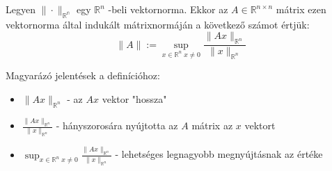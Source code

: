 \begin{definition}
    Legyen $\| \cdot \| _\mathbb{R^{n}}$ egy $\mathbb{R}^{n}$ -beli vektornorma. Ekkor az $A \in \mathbb{R}^{n \times n}$ mátrix ezen vektornorma által indukált mátrixnormáján a következő számot értjük: 
    \begin{equation*}
\| A \| := \sup_{x \in \mathbb{R}^{n} \; x \neq 0} \frac{\| Ax \| _{\mathbb{R}^{n}}}{\| x \| _{\mathbb{R}^{n}}}
    \end{equation*}
\end{definition}
Magyarázó jelentések a definícióhoz:
\begin{itemize}
    \item $\| Ax \|_{\mathbb{R}^{n}}$ - az $Ax$ vektor "hossza"
    \item $\frac{\| Ax \| _{\mathbb{R}^{n}}}{\| x \| _{\mathbb{R}^{n}}}$ - hányszorosára nyújtotta az $A$ mátrix az $x$ vektort
    \item $\sup_{x \in \mathbb{R}^{n} \; x \neq 0} \frac{\| Ax \| _{\mathbb{R}^{n}}}{\| x \| _{\mathbb{R}^{n}}}$ - lehetséges legnagyobb megnyújtásnak az értéke
\end{itemize}

